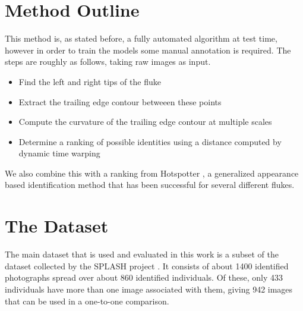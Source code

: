\section{Method Outline}

This method is, as stated before, a fully automated algorithm at test time, however in order to train the models some manual annotation is required.
The steps are roughly as follows, taking raw images as input.

\begin{itemize}
	\item Find the left and right tips of the fluke
	\item Extract the trailing edge contour betweeen these points
	\item Compute the curvature of the trailing edge contour at multiple scales
	\item Determine a ranking of possible identities using a distance computed by dynamic time warping 
\end{itemize}

We also combine this with a ranking from Hotspotter \cite{crall_hotspotter_2013}, a generalized appearance based identification method that has been successful for several different flukes. 




\section{The Dataset}

The main dataset that is used and evaluated in this work is a subset of the dataset collected by the SPLASH project \cite{calambokidis2008splash}. 
It consists of about 1400 identified photographs spread over about 860 identified individuals.
Of these, only 433 individuals have more than one image associated with them, giving 942 images that can be used in a one-to-one comparison.

